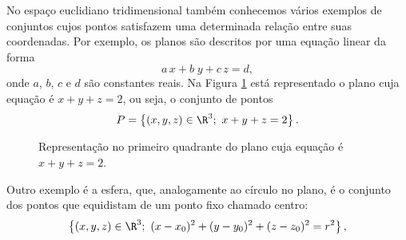No espaço euclidiano tridimensional também conhecemos vários exemplos de conjuntos cujos pontos satisfazem uma determinada relação entre suas coordenadas. Por exemplo, os planos são descritos por uma equação linear da forma
\begin{equation}\label{eq:plano}
    a\,x+b\;y +c\, z =d,
\end{equation}
onde $a$, $b$, $c$ e $d$ são constantes reais. %
Na Figura \ref{exem:plano} está representado o plano cuja equação é $x+y+z=2$, ou seja, o conjunto de pontos
$$P=\left\{(x,y,z)\in\R^3;~x+y+z=2\right\}.$$
\begin{figure}[!htb]
\centering
{} %
\caption{Representação no primeiro quadrante do plano cuja equação é $x+y+z=2$.}
\label{exem:plano}
\end{figure}

Outro exemplo é a esfera, que, analogamente ao círculo no plano, é o conjunto dos pontos que equidistam de um ponto fixo chamado centro: 
\begin{equation}\label{eq:esfera}
    \left\{(x,y,z)\in\R^3;~ (x-x_0)^2+(y-y_0)^2+(z-z_0)^2=r^2\right\},
\end{equation}

